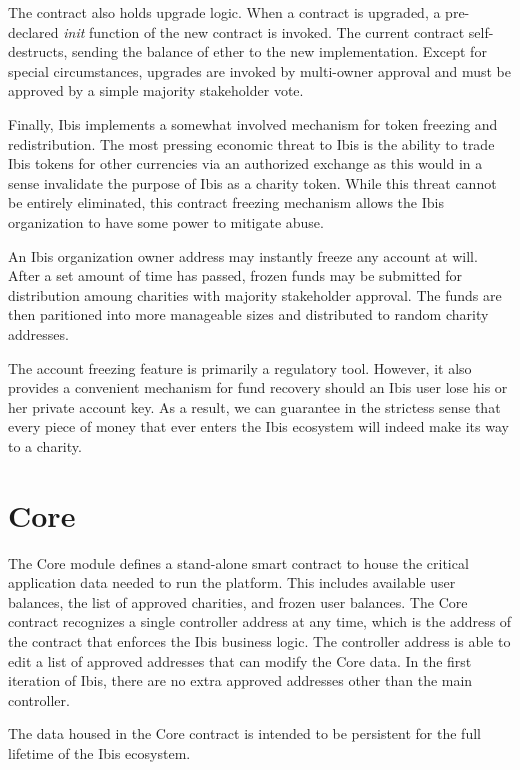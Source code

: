\documentclass{article}
\begin{document}
The contract also holds upgrade logic. When a contract is upgraded, a
pre-declared \emph{init} function of the new contract is invoked. The current
contract self-destructs, sending the balance of ether to the new
implementation. Except for special circumstances, upgrades are invoked by
multi-owner approval and must be approved by a simple majority stakeholder vote.

Finally, Ibis implements a somewhat involved mechanism for token freezing and
redistribution. The most pressing economic threat to Ibis is the ability to
trade Ibis tokens for other currencies via an authorized exchange as this would
in a sense invalidate the purpose of Ibis as a charity token. While this threat
cannot be entirely eliminated, this contract freezing mechanism allows the Ibis
organization to have some power to mitigate abuse.

An Ibis organization owner address may instantly freeze any account at
will. After a set amount of time has passed, frozen funds may be submitted for
distribution amoung charities with majority stakeholder approval. The funds are
then paritioned into more manageable sizes and distributed to random charity
addresses.

The account freezing feature is primarily a regulatory tool. However, it also
provides a convenient mechanism for fund recovery should an Ibis user lose his
or her private account key. As a result, we can guarantee in the strictess sense
that every piece of money that ever enters the Ibis ecosystem will indeed make
its way to a charity.

\section{Core}

The Core module defines a stand-alone smart contract to house the critical
application data needed to run the platform. This includes available user
balances, the list of approved charities, and frozen user balances. The Core
contract recognizes a single controller address at any time, which is the
address of the contract that enforces the Ibis business logic. The controller
address is able to edit a list of approved addresses that can modify the Core
data. In the first iteration of Ibis, there are no extra approved addresses
other than the main controller.

The data housed in the Core contract is intended to be persistent for the full
lifetime of the Ibis ecosystem.
\end{document}
